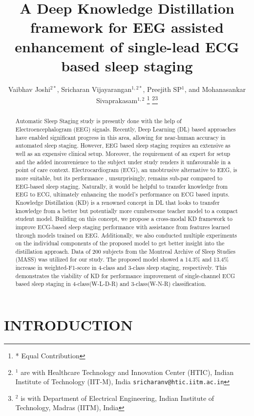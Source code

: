 \documentclass[letterpaper, 10 pt, conference]{ieeeconf}
\title{\LARGE \bf
A Deep Knowledge Distillation framework for EEG assisted enhancement of single-lead ECG based sleep staging
}
\author{Vaibhav Joshi$^{2*}$, Sricharan Vijayarangan$^{1,2*}$, Preejith SP$^{1}$, and Mohanasankar Sivaprakasam$^{1,2}$  \thanks{* Equal Contribution}
\thanks{$^{1}$ are with Healthcare Technology and Innovation Center (HTIC),
        Indian Institute of Technology (IIT-M), India
        {\tt\small sricharanv@htic.iitm.ac.in}}\thanks{$^{2}$ is with Department of Electrical Engineering,
        Indian Institute of Technology, Madras (IITM), India
        {}}}
\begin{document}
\maketitle



\begin{abstract}



Automatic Sleep Staging study is presently done with the help of Electroencephalogram (EEG) signals. Recently, Deep Learning (DL) based approaches have enabled significant progress in this area, allowing for near-human accuracy in automated sleep staging. However, EEG based sleep staging requires an extensive as well as an expensive clinical setup. Moreover, the requirement of an expert for setup and the added inconvenience to the subject under study renders it unfavourable in a point of care context. Electrocardiogram (ECG), an unobtrusive alternative to EEG, is more suitable, but its performance , unsurprisingly, remains sub-par compared to EEG-based sleep staging. Naturally, it would be helpful to transfer knowledge from EEG to ECG, ultimately enhancing the model's performance on ECG based inputs. Knowledge Distillation (KD) is a renowned concept in DL that looks to transfer knowledge from a better but potentially more cumbersome teacher model to a compact student model.  Building on this concept, we propose a cross-modal KD framework to improve ECG-based sleep staging performance with assistance from features learned through models trained on EEG. Additionally, we also conducted multiple experiments on the individual components of the proposed model to get better insight into the distillation approach. Data of 200 subjects from the Montreal Archive of Sleep Studies (MASS) was utilized for our study. The proposed model showed a 14.3\% and 13.4\% increase in weighted-F1-score in 4-class and 3-class sleep staging, respectively. This demonstrates the viability of KD for performance improvement of single-channel ECG based sleep staging in 4-class(W-L-D-R) and 3-class(W-N-R) classification.


\end{abstract}


\section{INTRODUCTION}
\end{document}
